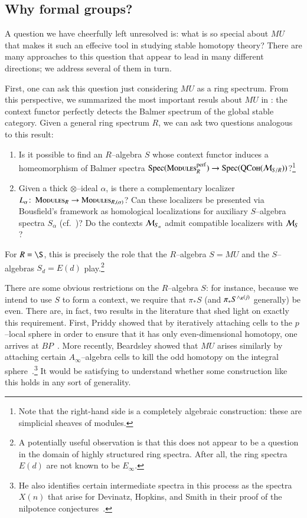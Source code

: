 \subsection*{Why formal groups?}

A question we have cheerfully left unresolved is: what is so special about $MU$ that makes it such an effecive tool in studying stable homotopy theory?  There are many approaches to this question that appear to lead in many different directions; we address several of them in turn.

First, one can ask this question just considering $MU$ as a ring spectrum.  From this perspective, we summarized the most important resuls about $MU$ in : the context functor perfectly detects the Balmer spectrum of the global stable category.  Given a general ring spectrum $R$, we can ask two questions analogous to this result:
\begin{enumerate}
\item Is it possible to find an $R$--algebra $S$ whose context functor induces a homeomorphism of Balmer spectra $\operatorname{Spec}(\normalfont\textsc{Modules}_R^{\mathrm{perf}}) \to \operatorname{Spec}(\normalfont\textsc{QCoh}(\mathcal{M}_{S/R}))$?\footnote{Note that the right-hand side is a completely algebraic construction: these are simplicial sheaves of modules.}
\item Given a thick $\otimes$--ideal $\alpha$, is there a complementary localizer $L_\alpha\colon\thinspace \normalfont\textsc{Modules}_R \to \normalfont\textsc{Modules}_{R,(\alpha)}$?  Can these localizers be presented via Bousfield's framework as homological localizations for auxiliary $S$--algebra spectra $S_\alpha$ (cf.\ )?  Do the contexts $\mathcal{M}_{S_\alpha}$ admit compatible localizers with $\mathcal{M}_{S}$?
\end{enumerate}
For $R = \S$, this is precisely the role that the $R$--algebra $S = MU$ and the $S$--algebras $S_d = E(d)$ play.\footnote{A potentially useful observation is that this does not appear to be a question in the domain of highly structured ring spectra.  After all, the ring spectra $E(d)$ are not known to be $E_\infty$.}

There are some obvious restrictions on the $R$--algebra $S$: for instance, because we intend to use $S$ to form a context, we require that $\pi_* S$ (and $\pi_* S^{\wedge_R (j)}$ generally) be even.  There are, in fact, two results in the literature that shed light on exactly this requirement.  First, Priddy showed that by iteratively attaching cells to the $p$--local sphere in order to ensure that it has only even-dimensional homotopy, one arrives at $BP$~\cite{Priddy}.  More recently, Beardsley showed that $MU$ arises similarly by attaching certain $A_\infty$--algebra cells to kill the odd homotopy on the integral sphere~\cite{Beardsley}.\footnote{He also identifies certain intermediate spectra in this process as the spectra $X(n)$ that arise for Devinatz, Hopkins, and Smith in their proof of the nilpotence conjectures~\cite{DHS}.}  It would be satisfying to understand whether some construction like this holds in any sort of generality.


